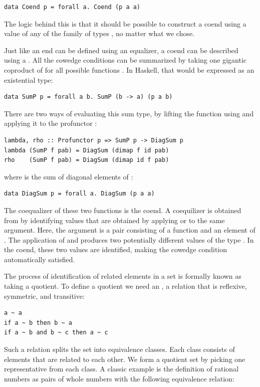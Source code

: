 \begin{verbatim}
data Coend p = forall a. Coend (p a a)
\end{verbatim}
The logic behind this is that it should be possible to construct a coend
using a value of any of the family of types , no matter
what  we chose.

Just like an end can be defined using an equalizer, a coend can be
described using a . All the cowedge conditions can be
summarized by taking one gigantic coproduct of  for all
possible functions . In Haskell, that would be
expressed as an existential type:

\begin{verbatim}
data SumP p = forall a b. SumP (b -> a) (p a b)
\end{verbatim}
There are two ways of evaluating this sum type, by lifting the function
using  and applying it to the profunctor :

\begin{verbatim}
lambda, rho :: Profunctor p => SumP p -> DiagSum p
lambda (SumP f pab) = DiagSum (dimap f id pab)
rho    (SumP f pab) = DiagSum (dimap id f pab)
\end{verbatim}
where  is the sum of diagonal elements of :

\begin{verbatim}
data DiagSum p = forall a. DiagSum (p a a)
\end{verbatim}
The coequalizer of these two functions is the coend. A coequilizer is
obtained from  by identifying values that are
obtained by applying  or  to the same
argument. Here, the argument is a pair consisting of a function
 and an element of . The
application of  and  produces two potentially
different values of the type . In the coend, these
two values are identified, making the cowedge condition automatically
satisfied.

The process of identification of related elements in a set is formally
known as taking a quotient. To define a quotient we need an
 \code{\textasciitilde{}}, a relation that
is reflexive, symmetric, and transitive:

\begin{verbatim}
a ~ a
if a ~ b then b ~ a
if a ~ b and b ~ c then a ~ c
\end{verbatim}
Such a relation splits the set into equivalence classes. Each class
consists of elements that are related to each other. We form a quotient
set by picking one representative from each class. A classic example is
the definition of rational numbers as pairs of whole numbers with the
following equivalence relation:

